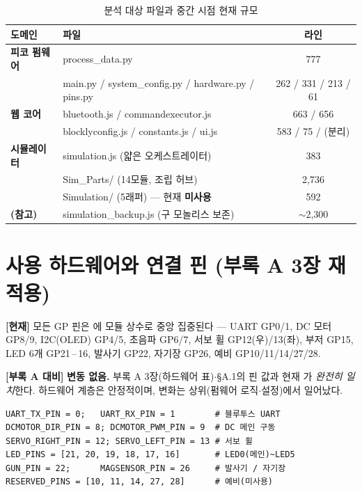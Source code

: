 \begin{table}[htbp]\centering\small
\caption{분석 대상 파일과 중간 시점 현재 규모}
\renewcommand{\arraystretch}{1.22}
\begin{tabularx}{\linewidth}{@{}>{\sffamily\bfseries}l >{\ttfamily\footnotesize}X c@{}}
\toprule
\sffamily 도메인 & \sffamily 파일 & \sffamily 라인 \\
\midrule
피코 펌웨어 & process\_data.py & 777 \\
            & main.py / system\_config.py / hardware.py / pins.py & 262 / 331 / 213 / 61 \\
웹 코어 & bluetooth.js / commandexecutor.js & 663 / 656 \\
        & blocklyconfig.js / constants.js / ui.js & 583 / 75 / (분리) \\
시뮬레이터 & simulation.js (얇은 오케스트레이터) & 383 \\
           & Sim\_Parts/ (14모듈, 조립 허브) & 2{,}736 \\
           & Simulation/ (5래퍼) --- 현재 \textbf{미사용} & 592 \\
(참고) & simulation\_backup.js (구 모놀리스 보존) & $\sim$2{,}300 \\
\bottomrule
\end{tabularx}
\end{table}

\section{사용 하드웨어와 연결 핀 (부록 A 3장 재적용)}
\textbf{[현재]} 모든 GP 핀은 에 모듈 상수로 중앙 집중된다 --- UART GP0/1,
DC 모터 GP8/9, I2C(OLED) GP4/5, 초음파 GP6/7, 서보 휠 GP12(우)/13(좌), 부저 GP15, LED 6개
GP21\,--\,16, 발사기 GP22, 자기장 GP26, 예비 GP10/11/14/27/28.

\smallskip
\noindent\textbf{[부록 A 대비]} \textbf{변동 없음.} 부록 A 3장(하드웨어 표)$\cdot$\S A.1의 핀 값과
현재 가 \emph{완전히 일치}한다. 하드웨어 계층은 안정적이며, 변화는 상위(펌웨어
로직$\cdot$설정)에서 일어났다.

\begin{verbatim}
UART_TX_PIN = 0;   UART_RX_PIN = 1        # 블루투스 UART
DCMOTOR_DIR_PIN = 8; DCMOTOR_PWM_PIN = 9  # DC 메인 구동
SERVO_RIGHT_PIN = 12; SERVO_LEFT_PIN = 13 # 서보 휠
LED_PINS = [21, 20, 19, 18, 17, 16]       # LED0(메인)~LED5
GUN_PIN = 22;      MAGSENSOR_PIN = 26     # 발사기 / 자기장
RESERVED_PINS = [10, 11, 14, 27, 28]      # 예비(미사용)
\end{verbatim}

